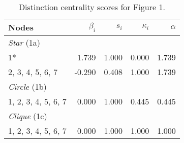 \begin{table}
\footnotesize
\centering
\caption{\label{tab:star}Distinction centrality scores for Figure 1.}
\centering
\begin{tabular}[t]{lrrrr}
Nodes & $\beta_i$ & $s_i$ & $\kappa_i$ & $\alpha$\\
\toprule
\midrule
\textit{Star} (1a)\\
1* & 1.739 & 1.000 & 0.000 & 1.739\\
2, 3, 4, 5, 6, 7 & -0.290 & 0.408 & 1.000 & 1.739\\
\midrule
\midrule
\textit{Circle} (1b)\\
1, 2, 3, 4, 5, 6, 7 & 0.000 & 1.000 & 0.445 & 0.445\\
\midrule
\midrule
\textit{Clique} (1c)\\
1, 2, 3, 4, 5, 6, 7 & 0.000 & 1.000 & 1.000 & 1.000\\
\bottomrule
\bottomrule
\end{tabular}
\end{table}

